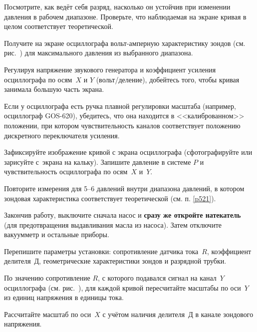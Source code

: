 \begin{lab:task}
\item \label{p521} Посмотрите, как ведёт себя разряд, насколько он устойчив при изменении
давления в рабочем диапазоне. Проверьте, что наблюдаемая 
на экране кривая в целом соответствует теоретической.


\item Получите на экране осциллографа вольт-амперную характеристику зондов
(см. рис.~) для максимального давления из
выбранного диапазона.

\item Регулируя напряжение звукового генератора и коэффициент усиления 
осциллографа по осям~$X$ и $Y$ (вольт/деление), 
добейтесь того, чтобы кривая занимала большую часть экрана. 

Если у осциллографа есть ручка плавной регулировки масштаба
(например, осциллограф GOS-620), убедитесь, что она находится в 
<<калиброванном>> положении, при котором чувствительность каналов 
соответствует положению дискретного переключателя усиления.

\item Зафиксируйте изображение кривой с экрана осциллографа 
(сфотографируйте или зарисуйте с~экрана на кальку). 
Запишите давление в системе $P$ и чувствительность осциллографа по 
осям~$X$ и~$Y$.

\item Повторите измерения для 5--6 давлений внутри диапазона давлений, 
в котором зондовая характеристика соответствует теоретической
(см. п. \ref{p521}).

\item Закончив работу, выключите сначала насос и \textbf{сразу же откройте натекатель}
(для предотвращения выдавливания масла из насоса).
Затем отключите вакуумметр и остальные приборы.

\item Перепишите параметры установки: сопротивление датчика тока~$R$, коэффициент
делителя~Д, геометрические характеристики зондов и разрядной трубки.


\item По значению сопротивление $R$, с которого подавался
сигнал на канал~$Y$ осциллографа  (см. рис.~), 
для каждой кривой пересчитайте масштабы по оси~$Y$ из единиц
напряжения в единицы тока.
 
Рассчитайте масштаб по оси~$X$ с учётом наличия делителя~Д в канале 
зондового напряжения.


\end{lab:task}
